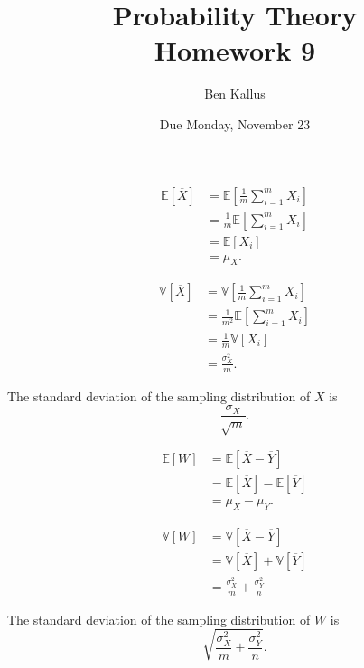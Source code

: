 \documentclass[12pt]{article}
\title{Probability Theory \\ Homework 9}
\author{Ben Kallus}
\date{Due Monday, November 23}
\begin{document}
\pagecolor{black}
\color{white}
\maketitle


\medskip
{}
\begin{align*}
    \mathbb E [\overline X] &= \mathbb E\left[\frac1m \sum_{i=1}^m X_i\right] \\
                            &= \frac1m \mathbb E\left[ \sum_{i=1}^m X_i \right] \\
                            &= \mathbb E[X_i] \\
                            &= \mu_X.
\end{align*}

\begin{align*}
    \mathbb V [\overline X] &= \mathbb V\left[\frac1m \sum_{i=1}^m X_i\right] \\
                            &= \frac1{m^2} \mathbb E\left[ \sum_{i=1}^m X_i \right] \\
                            &= \frac1m \mathbb V[X_i] \\
                            &= \frac{\sigma^2_X}m.
\end{align*}

The standard deviation of the sampling distribution of $\overline X$ is $$\frac{\sigma_X}{\sqrt m}.$$

\medskip
{}
\begin{align*}
    \mathbb E[W] &= \mathbb E[\overline X - \overline Y] \\
                 &= \mathbb E[\overline X] - \mathbb E[\overline Y] \\
                 &= \mu_X - \mu_Y.
\end{align*}

\begin{align*}
    \mathbb V[W] &= \mathbb V[\overline X - \overline Y] \\
                 &= \mathbb V[\overline X] + \mathbb V[\overline Y] \\
                 &= \frac{\sigma^2_X}m + \frac{\sigma^2_Y}n
\end{align*}

The standard deviation of the sampling distribution of $W$ is $$\sqrt{\frac{\sigma^2_X}m + \frac{\sigma^2_Y}n}.$$


\newpage
{}
\end{document}
